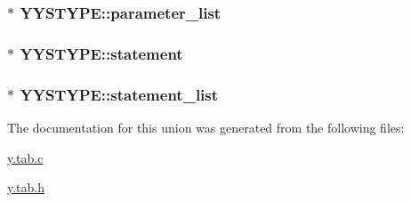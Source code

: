 \subsubsection[{parameter\+\_\+list}]{ $\ast$ Y\+Y\+S\+T\+Y\+P\+E\+::parameter\+\_\+list}\label{union_y_y_s_t_y_p_e_afd386339b68e2828f86d0c0df7f20d5c}
\hypertarget{union_y_y_s_t_y_p_e_a3a91e31e5e63f3d04553e8c84a03a439}{}
\subsubsection[{statement}]{ $\ast$ Y\+Y\+S\+T\+Y\+P\+E\+::statement}\label{union_y_y_s_t_y_p_e_a3a91e31e5e63f3d04553e8c84a03a439}
\hypertarget{union_y_y_s_t_y_p_e_a9ee5746ab7ab41340e386cf1b205c6a5}{}
\subsubsection[{statement\+\_\+list}]{ $\ast$ Y\+Y\+S\+T\+Y\+P\+E\+::statement\+\_\+list}\label{union_y_y_s_t_y_p_e_a9ee5746ab7ab41340e386cf1b205c6a5}


The documentation for this union was generated from the following files\+:\begin{DoxyCompactItemize}
\item 
\hyperlink{y_8tab_8c}{y.\+tab.\+c}\item 
\hyperlink{y_8tab_8h}{y.\+tab.\+h}\end{DoxyCompactItemize}

